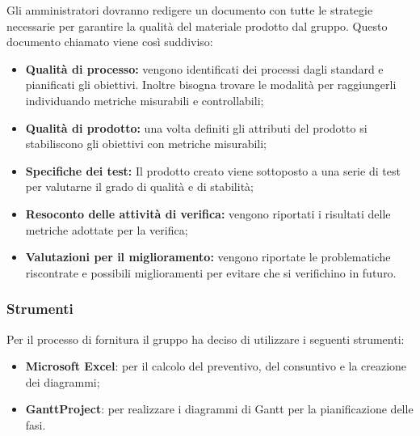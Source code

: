 \myparagraph{\PdQ} 
Gli amministratori dovranno redigere un documento con tutte le strategie necessarie per garantire la qualità del materiale prodotto dal gruppo. Questo documento chiamato \PdQv{}viene così suddiviso:
\begin{itemize}
    \item \textbf{Qualità di processo:} vengono identificati dei processi dagli standard e pianificati gli obiettivi. Inoltre bisogna trovare le modalità per raggiungerli individuando metriche misurabili e controllabili;    
    \item \textbf{Qualità di prodotto:} una volta definiti gli attributi del prodotto si stabiliscono gli obiettivi con metriche misurabili;    
     \item \textbf{Specifiche dei test:} Il prodotto creato viene sottoposto a una serie di test per valutarne il grado di qualità e di stabilità;
     \item \textbf{Resoconto delle attività di verifica:} vengono riportati i risultati delle metriche adottate per la verifica;
    \item \textbf{Valutazioni per il miglioramento:} vengono riportate le problematiche riscontrate e possibili miglioramenti per evitare che si verifichino in futuro.
\end{itemize}

\subsubsection{Strumenti}
Per il processo di fornitura il gruppo ha deciso di utilizzare i seguenti strumenti:
\begin{itemize}
    \item \textbf{Microsoft Excel}: per il calcolo del preventivo, del consuntivo e la creazione dei diagrammi;
    \item \textbf{GanttProject}: per realizzare i diagrammi di Gantt per la pianificazione delle fasi.
\end{itemize}
